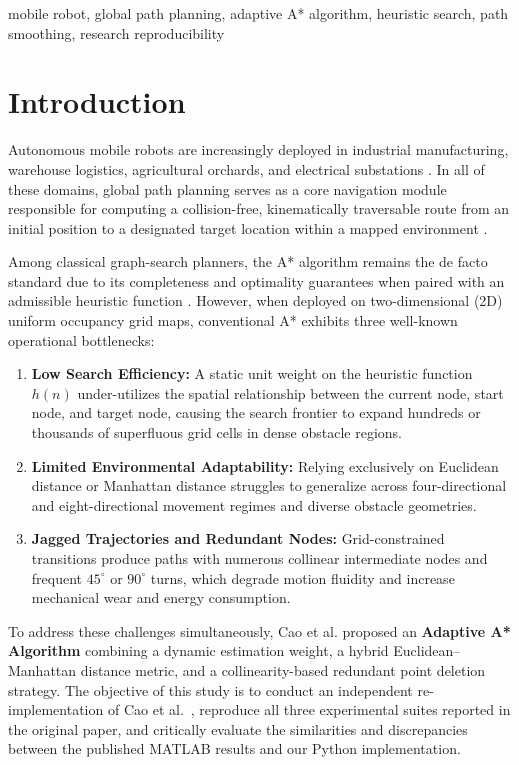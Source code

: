 \documentclass[conference]{IEEEtran}
\begin{document}
\begin{IEEEkeywords}
mobile robot, global path planning, adaptive A* algorithm, heuristic search, path smoothing, research reproducibility
\end{IEEEkeywords}

\section{Introduction}
Autonomous mobile robots are increasingly deployed in industrial manufacturing, warehouse logistics, agricultural orchards, and electrical substations \cite{cao2026adaptive, lopez2024axisymmetric, ye2023path}. In all of these domains, global path planning serves as a core navigation module responsible for computing a collision-free, kinematically traversable route from an initial position to a designated target location within a mapped environment \cite{dijkstra1959note, huang2025self}.

Among classical graph-search planners, the A* algorithm remains the de facto standard due to its completeness and optimality guarantees when paired with an admissible heuristic function \cite{guo2024path}. However, when deployed on two-dimensional (2D) uniform occupancy grid maps, conventional A* exhibits three well-known operational bottlenecks:
\begin{enumerate}
    \item \textbf{Low Search Efficiency:} A static unit weight on the heuristic function $h(n)$ under-utilizes the spatial relationship between the current node, start node, and target node, causing the search frontier to expand hundreds or thousands of superfluous grid cells in dense obstacle regions.
    \item \textbf{Limited Environmental Adaptability:} Relying exclusively on Euclidean distance or Manhattan distance struggles to generalize across four-directional and eight-directional movement regimes and diverse obstacle geometries.
    \item \textbf{Jagged Trajectories and Redundant Nodes:} Grid-constrained transitions produce paths with numerous collinear intermediate nodes and frequent $45^\circ$ or $90^\circ$ turns, which degrade motion fluidity and increase mechanical wear and energy consumption.
\end{enumerate}

To address these challenges simultaneously, Cao et al. \cite{cao2026adaptive} proposed an \textbf{Adaptive A* Algorithm} combining a dynamic estimation weight, a hybrid Euclidean--Manhattan distance metric, and a collinearity-based redundant point deletion strategy. The objective of this study is to conduct an independent re-implementation of Cao et al.~\cite{cao2026adaptive}, reproduce all three experimental suites reported in the original paper, and critically evaluate the similarities and discrepancies between the published MATLAB results and our Python implementation.
\end{document}
